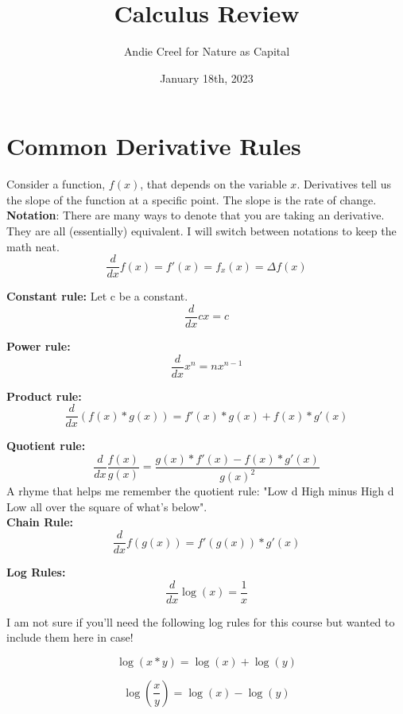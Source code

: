 \documentclass{article}
\title{Calculus Review}
\author{Andie Creel for Nature as Capital}
\date{January 18th, 2023}
\begin{document}
\maketitle


\section{Common Derivative Rules}
Consider a function, $f(x)$, that depends on the variable $x$. Derivatives tell us the slope of the function at a specific point. The slope is the rate of change. \\

\textbf{Notation}: There are many ways to denote that you are taking an derivative. They are all (essentially) equivalent. I will switch between notations to keep the math neat.  
$$\frac{d}{dx}f(x) = f'(x) = f_x(x) = \Delta f(x)$$

\textbf{Constant rule:} Let c be a constant. 
$$\frac{d}{dx} cx = c$$

\textbf{Power rule:} $$\frac{d}{dx}x^n = n x^{n-1}$$

\textbf{Product rule:} $$\frac{d}{dx}(f(x) * g(x)) = f'(x)*g(x) + f(x)*g'(x)$$

\textbf{Quotient rule:} $$\frac{d}{dx} \frac{f(x)}{g(x)} = \frac{g(x)*f'(x)  - f(x) * g'(x)}{g(x)^2}$$
A rhyme that helps me remember the quotient rule: "Low d High minus High d Low all over the square of what's below".  \\

\textbf{Chain Rule:} $$\frac{d}{dx} f(g(x)) = f'(g(x)) * g'(x) $$

\textbf{Log Rules: } $$\frac{d}{dx}\log(x) = \frac{1}{x}$$

I am not sure if you'll need the following log rules for this course but wanted to include them here in case!

$$\log(x*y) = \log(x) + \log(y)$$ 

$$\log(\frac{x}{y}) = \log(x) - \log(y) $$
\end{document}
